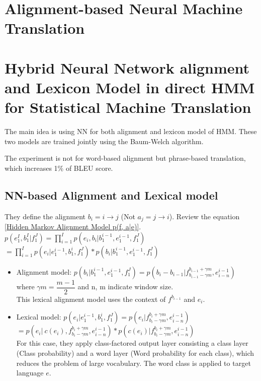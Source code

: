 \documentclass{article}
\begin{document}
\section{Alignment-based Neural Machine Translation \citep{Alkhouli2016AlignmentBasedNM} }






\section{Hybrid Neural Network alignment and Lexicon Model in direct HMM for Statistical Machine Translation \citep{Wang2017HybridNN} }
The main idea is using NN for both alignment and lexicon model of HMM. These two models are trained jointly using the Baum-Welch algorithm.

The experiment is not for word-based alignment but phrase-based translation, which increases 1\% of BLEU score.

\subsection{NN-based Alignment and Lexical model}
They define the alignment $b_{i} = i \rightarrow j $ (Not $a_{j} = j \rightarrow i $). Review the equation \eqref{Hidden Markov Alignment Model p(f, a|e)}. \\
$p(e_1^I, b_1^I|f_1^J) = \prod_{i=1}^I p(e_i, b_i | b_1^{i-1}, e_1^{i-1}, f_1^J)
$\\
$ = \prod_{i=1}^I p( e_i | e_1^{i-1}, b_1^i, f_1^J) * p( b_i |b_1^{i-1}, e_1^{i-1}, f_1^J)
$

\begin{itemize}
\item Alignment model: $p( b_i |b_1^{i-1}, e_1^{i-1},  f_1^J) = p(b_i - b_{i-1}| f^{b_{i-1} + \gamma m}_{b_{i-1} - \gamma m}, e_{i-n}^{i-1})$ \\
where $\gamma m = \dfrac{m-1}{2}$ and n, m indicate window size.\\
This lexical alignment model uses the context of $f^{b_{i-1}}$ and $e_i$.

\item Lexical model: $p( e_i | e_1^{i-1}, b_1^{i}, f_1^J) = p(e_i|f^{b_{i} + \gamma m}_{b_{i} - \gamma m}, e_{i-n}^{i-1}  )$\\
$= p(e_i| \: c(e_i),f^{b_{i} + \gamma m}_{b_{i} - \gamma m}, e_{i-n}^{i-1}) * p(c(e_i)|f^{b_{i} + \gamma m}_{b_{i} - \gamma m}, e_{i-n}^{i-1})$\\
For this case, they apply class-factored output layer consisting a class layer (Class probability) and a word layer (Word probability for each class), which reduces the problem of large vocabulary. The word class is applied to target language $e$.
\end{itemize}
\end{document}

